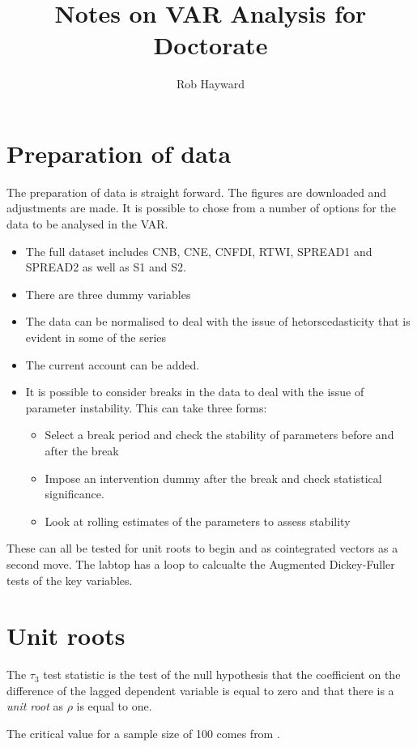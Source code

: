 \documentclass{article}\usepackage{graphicx, color}
\title{Notes on VAR Analysis for Doctorate}
\author{Rob Hayward}
\begin{document}
\maketitle

\section{Preparation of data}
The preparation of data is straight forward.  The figures are downloaded and adjustments are made.  It is possible to chose from a number of options for the data to be analysed in the VAR. 
\begin{itemize}
\item The full dataset includes CNB, CNE, CNFDI, RTWI, SPREAD1 and SPREAD2 as well as S1 and S2.  
\item There are three dummy variables
\item The data can be normalised to deal with the issue of hetorscedasticity that is evident in some of the series
\item The current account can be added.  
\item It is possible to consider breaks in the data to deal with the issue of parameter instability. This can take three forms: 
\begin{itemize}
\item Select a break period and check the stability of parameters before and after the break
\item Impose an intervention dummy after the break and check statistical significance. 
\item Look at rolling estimates of the parameters to assess stability
\end{itemize}
\end{itemize}

These can all be tested for unit roots to begin and as cointegrated vectors as a second move.  The labtop has a loop to calcualte the Augmented Dickey-Fuller tests of the key variables. 

\section{Unit roots}

The $\tau_3$ test statistic is the test of the null hypothesis that the coefficient on the difference of the lagged dependent variable is equal to zero and that there is a \emph{unit root} as $\rho$ is equal to one.  


The critical value for a sample size of 100 comes from \citep{Fuller1976}. 
\end{document}
